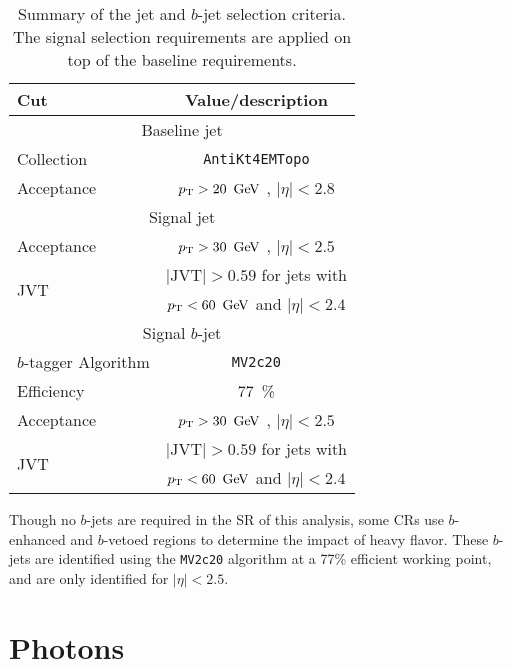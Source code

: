 \begin{table}[bh!]
\begin{center}
    \begin{tabular}{l|c}
      \hline
      Cut            & Value/description \\
      \hline
      \hline
      \multicolumn{2}{c}{Baseline jet} \\
      \hline
      Collection     & \texttt{AntiKt4EMTopo} \\
      Acceptance     & $\pt > 20\,\GeV$ , $|\eta |<2.8$ \\
      \hline
      \multicolumn{2}{c}{Signal jet} \\
      \hline
      Acceptance     & $\pt > 30\,\GeV$ , $|\eta | < 2.5$ \\ 
      \multirow{2}{*}{JVT}      & $|\mathrm{JVT}|>0.59$ for jets with \\
                                & $\pt <60\,\GeV$ and $|\eta | < 2.4$ \\
      \hline
      \multicolumn{2}{c}{Signal $b$-jet} \\
      \hline 
      $b$-tagger Algorithm      & \texttt{MV2c20} \\
      Efficiency                & $77$~\% \\
      Acceptance                & $\pt > 30\,\GeV$ , $|\eta | < 2.5$ \\ 
      \multirow{2}{*}{JVT}      & $|\mathrm{JVT}|>0.59$ for jets with \\
                                & $\pt <60\,\GeV$ and $|\eta | < 2.4$ \\
      \hline
      \hline
\end{tabular}
\end{center}
\caption{Summary of the jet and $b$-jet selection criteria. The signal selection
  requirements are applied on top of the baseline requirements. }
\label{tab:jetsdef}
\end{table}

Though no $b$-jets are required in the \ac{SR} of this analysis, some \acp{CR} use $b$-enhanced and $b$-vetoed regions to determine the impact of heavy flavor. These $b$-jets are identified using the \texttt{MV2c20} algorithm at a 77\% efficient working point, and are only identified for $|\eta|<2.5$. 
\section{Photons}

